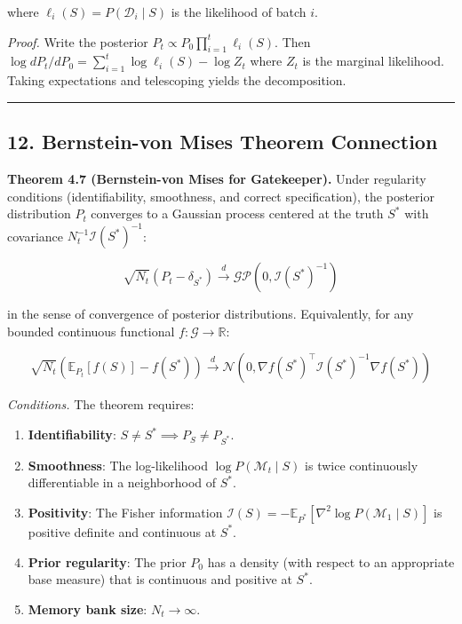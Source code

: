 \documentclass[
  12pt,
]{article}
\providecommand{\tightlist}{%
  \setlength{\itemsep}{0pt}\setlength{\parskip}{0pt}}
\begin{document}
where \(\ell_i(S) = P(\mathcal{D}_i \mid S)\) is the likelihood of batch
\(i\).

\emph{Proof.} Write the posterior
\(P_t \propto P_0 \prod_{i=1}^t \ell_i(S)\). Then
\(\log dP_t/dP_0 = \sum_{i=1}^t \log \ell_i(S) - \log Z_t\) where
\(Z_t\) is the marginal likelihood. Taking expectations and telescoping
yields the decomposition.

\begin{center}\rule{0.5\linewidth}{0.5pt}\end{center}

\subsection{12. Bernstein-von Mises Theorem
Connection}\label{bernstein-von-mises-theorem-connection}

\textbf{Theorem 4.7 (Bernstein-von Mises for Gatekeeper).} Under
regularity conditions (identifiability, smoothness, and correct
specification), the posterior distribution \(P_t\) converges to a
Gaussian process centered at the truth \(S^*\) with covariance
\(N_t^{-1} \mathcal{I}(S^*)^{-1}\):

\[
\sqrt{N_t} (P_t - \delta_{S^*}) \xrightarrow{d} \mathcal{GP}(0, \mathcal{I}(S^*)^{-1})
\]

in the sense of convergence of posterior distributions. Equivalently,
for any bounded continuous functional \(f: \mathcal{G} \to \mathbb{R}\):

\[
\sqrt{N_t} \left( \mathbb{E}_{P_t}[f(S)] - f(S^*) \right) \xrightarrow{d} \mathcal{N}(0, \nabla f(S^*)^\top \mathcal{I}(S^*)^{-1} \nabla f(S^*))
\]

\emph{Conditions.} The theorem requires:

\begin{enumerate}
\def\labelenumi{\arabic{enumi}.}
\tightlist
\item
  \textbf{Identifiability}: \(S \neq S^* \implies P_S \neq P_{S^*}\).
\item
  \textbf{Smoothness}: The log-likelihood
  \(\log P(\mathcal{M}_t \mid S)\) is twice continuously differentiable
  in a neighborhood of \(S^*\).
\item
  \textbf{Positivity}: The Fisher information
  \(\mathcal{I}(S) = -\mathbb{E}_{P^*}[\nabla^2 \log P(\mathcal{M}_1 \mid S)]\)
  is positive definite and continuous at \(S^*\).
\item
  \textbf{Prior regularity}: The prior \(P_0\) has a density (with
  respect to an appropriate base measure) that is continuous and
  positive at \(S^*\).
\item
  \textbf{Memory bank size}: \(N_t \to \infty\).
\end{enumerate}
\end{document}
